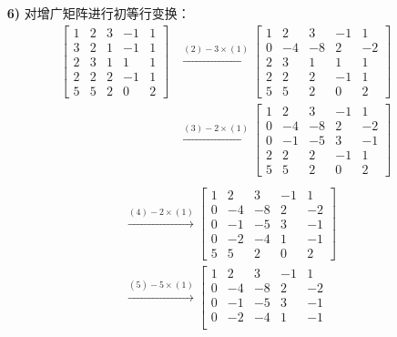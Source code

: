\begin{problem}
\begin{solution}
\begin{enumerate}
			\item[\textbf{6)}] 对增广矩阵进行初等行变换：
			$$
			\begin{aligned}
				\left[\begin{array}{cccc|c}
					1 & 2 & 3 & -1 & 1 \\
					3 & 2 & 1 & -1 & 1 \\
					2 & 3 & 1 & 1 & 1 \\
					2 & 2 & 2 & -1 & 1 \\
					5 & 5 & 2 & 0 & 2
				\end{array}\right]
				& \xrightarrow{(2) - 3 \times (1)} \left[\begin{array}{cccc|c}
					1 & 2 & 3 & -1 & 1 \\
					0 & -4 & -8 & 2 & -2 \\
					2 & 3 & 1 & 1 & 1 \\
					2 & 2 & 2 & -1 & 1 \\
					5 & 5 & 2 & 0 & 2
				\end{array}\right] \\
				& \xrightarrow{(3) - 2 \times (1)} \left[\begin{array}{cccc|c}
					1 & 2 & 3 & -1 & 1 \\
					0 & -4 & -8 & 2 & -2 \\
					0 & -1 & -5 & 3 & -1 \\
					2 & 2 & 2 & -1 & 1 \\
					5 & 5 & 2 & 0 & 2
				\end{array}\right] \\
			\end{aligned}
			$$
			$$
			\begin{aligned}
				& \xrightarrow{(4) - 2 \times (1)} \left[\begin{array}{cccc|c}
					1 & 2 & 3 & -1 & 1 \\
					0 & -4 & -8 & 2 & -2 \\
					0 & -1 & -5 & 3 & -1 \\
					0 & -2 & -4 & 1 & -1 \\
					5 & 5 & 2 & 0 & 2
				\end{array}\right] \\
				& \xrightarrow{(5) - 5 \times (1)} \left[\begin{array}{cccc|c}
					1 & 2 & 3 & -1 & 1 \\
					0 & -4 & -8 & 2 & -2 \\
					0 & -1 & -5 & 3 & -1 \\
					0 & -2 & -4 & 1 & -1 \\

\end{array}
\end{aligned}$$
\end{enumerate}
\end{solution}
\end{problem}
